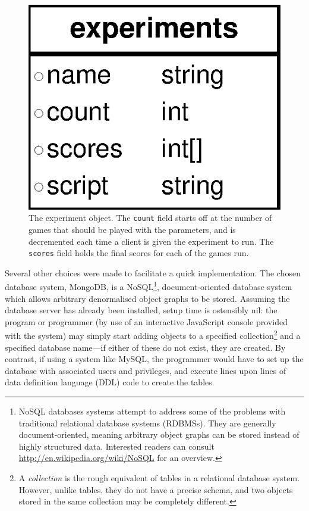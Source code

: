 \begin{figure}
\centering
\includegraphics[scale=0.8]{diagrams/experiments}
\caption[The experiment object]{The experiment object.  The {\tt count} field starts off at the number of games that should be played with the parameters, and is decremented each time a client is given the experiment to run.  The {\tt scores} field holds the final scores for each of the games run.}
\label{fig:experiments}
\end{figure}

Several other choices were made to facilitate a quick implementation.  The chosen database system, MongoDB, is a NoSQL\footnote{NoSQL databases systems attempt to address some of the problems with traditional relational database systems (RDBMSs).  They are generally document-oriented, meaning arbitrary object graphs can be stored instead of highly structured data.  Interested readers can consult \url{http://en.wikipedia.org/wiki/NoSQL} for an overview.}, document-oriented database system which allows arbitrary denormalised object graphs to be stored.  Assuming the database server has already been installed, setup time is ostensibly nil: the program or programmer (by use of an interactive JavaScript console provided with the system) may simply start adding objects to a specified collection\footnote{A \emph{collection} is the rough equivalent of tables in a relational database system.  However, unlike tables, they do not have a precise schema, and two objects stored in the same collection may be completely different.} and a specified database name---if either of these do not exist, they are created.  By contrast, if using a system like MySQL, the programmer would have to set up the database with associated users and privileges, and execute lines upon lines of data definition language (DDL) code to create the tables.

